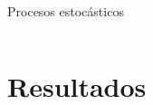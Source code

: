 \documentclass[fontsize=11bp]{beamer}
\begin{document}
\begin{frame}[t]{Procesos estocásticos}
{{\begin{columns}
        \begin{column}{0.5\textwidth}
        \end{column}
    \end{columns}

    }
     
}

\end{frame}

\section{Resultados}
\end{document}
